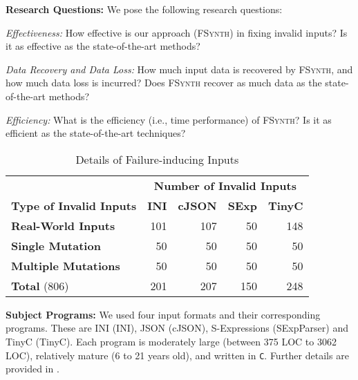 \documentclass[sigconf,review,anonymous]{acmart}
\def\<#1>{\texttt{#1}}
\newcommand{\approach}{\textsc{FSynth}\xspace}
\begin{document}

\noindent\textbf{Research Questions:} We pose the following research questions:
\begin{description}[wide, labelwidth=!, labelindent=0pt]
  \item[RQ1.] \emph{Effectiveness:}  %
How effective is our approach (\approach) in fixing invalid inputs? Is it as effective as the state-of-the-art methods?

\item[RQ2.] \emph{Data Recovery and Data Loss:}
How much input data is recovered by \approach, and how much data loss is incurred?  Does \approach recover as much data as 
the state-of-the-art methods?

\item[RQ3.] \emph{Efficiency:} What is the efficiency (i.e., time performance) of
\approach? Is it as efficient as the state-of-the-art techniques?
\end{description}

\begin{table}[!tbp]\centering
\caption{Details of Failure-inducing Inputs}
\begin{tabular}{|l | r | r | r | r |}
\hline
&  \multicolumn{4}{c|}{\textbf{Number of Invalid Inputs}}  \\
\textbf{Type of Invalid Inputs} & \textbf{INI} & \textbf{cJSON} & \textbf{SExp} & \textbf{TinyC} \\
\hline
\textbf{Real-World Inputs} & 101 & 107 & 50 & 148 \\
\textbf{Single Mutation} & 50 & 50 & 50 & 50 \\
\textbf{Multiple Mutations} & 50 & 50 & 50 & 50 \\
\hline
\textbf{Total } (806) & 201 & 207 & 150 & 248 \\
\hline
\end{tabular}
\label{tab:input-details}
\end{table}

\noindent\textbf{Subject Programs:} %
We used four input formats and their corresponding programs. These are INI (INI), JSON (cJSON), S-Expressions (SExpParser) and TinyC (TinyC). Each program is moderately large (between 375 LOC to 3062 LOC), relatively mature (6 to 21 years old), and written in \<C>. Further details are provided in .
\end{document}
